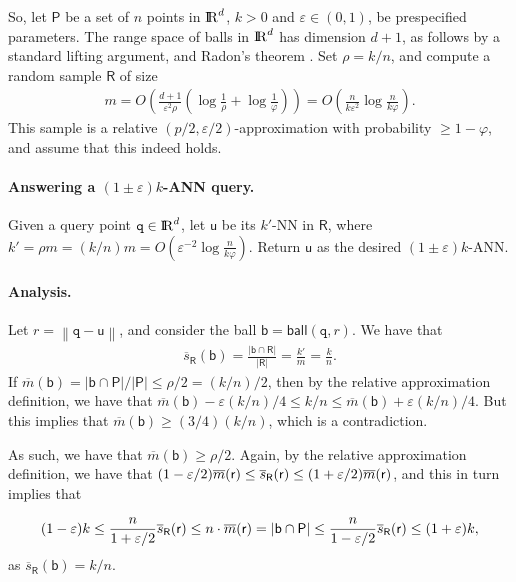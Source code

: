 \documentclass[12pt]{article}
\makeatletter
\newcommand{\Term}[1]{\textsf{#1}}
\newcommand{\TermI}[1]{\Term{#1}\index{#1@\Term{#1}}}
\theoremstyle{remark}{\theorembodyfont{\rm} \newtheorem{remark}[theorem]{Remark}}
\newcommand{\pth}[2][\!]{#1\left({#2}\right)}
\newcommand{\norm}[1]{\left\lVert {#1} \right \rVert}
\newcommand{\cardin}[1]{\left\lvert {#1} \right\rvert}
\newcommand{\eps}{{\varepsilon}}\newcommand{\divides}{|}
\newcommand{\ANN}{\TermI{ANN}\xspace}
\newcommand{\NNTerm}{\TermI{NN}\xspace}
\renewcommand{\Re}{{\rm I\!\hspace{-0.025em} R}}
\newcommand{\PntSet}{\mathsf{P}}
\newcommand{\query}{\mathtt{q}}
\newcommand{\pntA}{\mathsf{u}}
\newcommand{\dist}[2]{\norm{{#1}- {#2}}}
\newcommand{\ballA}{\mathsf{b}}
\newcommand{\ball}[2]{\mathsf{ball}\pth{#1,#2}}
\newcommand{\BadProb}{\varphi}
\newcommand{\prob}{\rho}
\newcommand{\MeasureChar}{\overline{m}}
\newcommand{\Measure}[1]{\MeasureChar\pth{#1}}
\newcommand{\sMeasureX}[2]{\overline{s}_{#2}\pth{#1}}
\newcommand{\RSample}{\mathsf{R}}
\makeatother
\begin{document}
So, let $\PntSet$ be a set of $n$ points in $\Re^d$, $k > 0$ and $\eps
\in (0,1)$, be prespecified parameters. The range space of balls in
$\Re^d$ has \VC dimension $d+1$, as follows by a standard lifting
argument, and Radon's theorem \cite{h-gaa-11}. Set $\prob = k/n$, and
compute a random sample $\RSample$ of size
\begin{align*}
    m=O\pth{ \frac{d+1}{\eps^{2}\prob} \pth{ \log \frac{1}{\prob} + \log
          \frac{1}{\BadProb} } }=O\pth{ \frac{n}{k \eps^2} \log \frac{n}{k \BadProb} }.
\end{align*}
This sample is a relative $(p/2,\eps/2)$-approximation
with probability $\geq 1- \BadProb$, and assume that this indeed
holds.

\paragraph{Answering a $(1\pm \eps)k$-\ANN query.}
Given a query point $\query \in \Re^d$, let $\pntA$ be its
$k'$-\NNTerm in $\RSample$, where $k' = \prob m = (k/n)m = O\pth{
   \eps^{-2} \log \frac{n}{k \BadProb} }$.  Return $\pntA$ as the
desired $(1\pm \eps)k$-\ANN.


\paragraph{Analysis.}
Let $r = \dist{\query}{\pntA}$, and consider the ball $\ballA =
\ball{\query}{r}$.  We have that
\begin{align*}
    \sMeasureX{\ballA}{\RSample}=\frac{\cardin{\ballA \cap \RSample}}{\cardin{\RSample}}=\frac{k'}{m}=\frac{k}{n}.
\end{align*}
If $\Measure{\ballA} = \cardin{\ballA \cap \PntSet} /\cardin{\PntSet}
\leq \prob /2 = (k/n)/2 $, then by the relative approximation
definition, we have that $\Measure{\ballA} - \eps (k/n)/4 \leq k/n
\leq \Measure{\ballA} +\eps (k/n)/4$. But this implies that
$\Measure{\ballA} \geq (3/4) (k/n)$, which is a contradiction.

As such, we have that $\Measure{\ballA} \geq \prob /2$. Again, by the
relative approximation definition, we have that $(1-\eps
/2)\Measure{\range} \leq \sMeasureX{\range}{\RSample} \leq (1+\eps
/2)\Measure{\range}$, and this in turn implies that

\begin{align*}
    (1-\eps) k\leq \frac{n}{1+\eps/2 } \sMeasureX{\range}{\RSample}\leq n \cdot \Measure{\range}=\cardin{\ballA \cap \PntSet}\leq \frac{n}{1-\eps/ 2} \sMeasureX{\range}{\RSample}\leq (1+\eps) k,
\end{align*}
as $\sMeasureX{\ballA}{\RSample} = k/n$.
\end{document}

